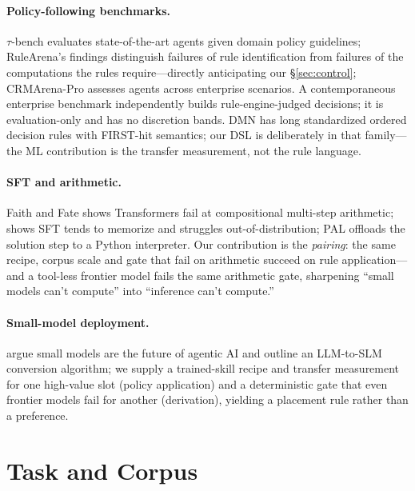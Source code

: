 \documentclass[11pt]{article}
\begin{document}
\paragraph{Policy-following benchmarks.} $\tau$-bench \citep{taubench2024} evaluates state-of-the-art agents given domain policy guidelines; RuleArena's \citep{rulearena2024} findings distinguish failures of rule identification from failures of the computations the rules require---directly anticipating our \S\ref{sec:control}; CRMArena-Pro \citep{crmarena2025} assesses agents across enterprise scenarios. A contemporaneous enterprise benchmark \citep{enterprisebench2026} independently builds rule-engine-judged decisions; it is evaluation-only and has no discretion bands. DMN \citep{dmn2024} has long standardized ordered decision rules with FIRST-hit semantics; our DSL is deliberately in that family---the ML contribution is the transfer measurement, not the rule language.

\paragraph{SFT and arithmetic.} Faith and Fate \citep{faithfate2023} shows Transformers fail at compositional multi-step arithmetic; \citet{sftmemorizes2025} shows SFT tends to memorize and struggles out-of-distribution; PAL \citep{pal2022} offloads the solution step to a Python interpreter. Our contribution is the \emph{pairing}: the same recipe, corpus scale and gate that fail on arithmetic succeed on rule application---and a tool-less frontier model fails the same arithmetic gate, sharpening ``small models can't compute'' into ``inference can't compute.''

\paragraph{Small-model deployment.} \citet{slmposition2025} argue small models are the future of agentic AI and outline an LLM-to-SLM conversion algorithm; we supply a trained-skill recipe and transfer measurement for one high-value slot (policy application) and a deterministic gate that even frontier models fail for another (derivation), yielding a placement rule rather than a preference.

\section{Task and Corpus}\label{sec:task}
\end{document}
